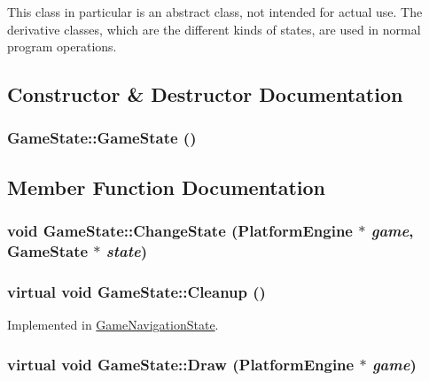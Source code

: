 This class in particular is an abstract class, not intended for actual use. The derivative classes, which are the different kinds of states, are used in normal program operations. 

\subsection{Constructor \& Destructor Documentation}
\hypertarget{class_game_state_4fa0a2bf50315c4a35a3890a0adcee5c}{
\subsubsection[{GameState}]{\setlength{\rightskip}{0pt plus 5cm}GameState::GameState ()}}
\label{dd/d87/class_game_state_4fa0a2bf50315c4a35a3890a0adcee5c}




\subsection{Member Function Documentation}
\hypertarget{class_game_state_f786aeb704a22a135dc289bb89fcc452}{
\subsubsection[{ChangeState}]{\setlength{\rightskip}{0pt plus 5cm}void GameState::ChangeState ({\bf PlatformEngine} $\ast$ {\em game}, \/  {\bf GameState} $\ast$ {\em state})}}
\label{dd/d87/class_game_state_f786aeb704a22a135dc289bb89fcc452}


\hypertarget{class_game_state_041e7a5430d71da84745af11abdacd93}{
\subsubsection[{Cleanup}]{\setlength{\rightskip}{0pt plus 5cm}virtual void GameState::Cleanup ()}}
\label{dd/d87/class_game_state_041e7a5430d71da84745af11abdacd93}




Implemented in \hyperlink{class_game_navigation_state_f93a7dbb7eac4b14a6d59cbca32b9abd}{GameNavigationState}.\hypertarget{class_game_state_7333dda0f49b3fa1c01cd3295f853024}{
\subsubsection[{Draw}]{\setlength{\rightskip}{0pt plus 5cm}virtual void GameState::Draw ({\bf PlatformEngine} $\ast$ {\em game})}}
\label{dd/d87/class_game_state_7333dda0f49b3fa1c01cd3295f853024}




